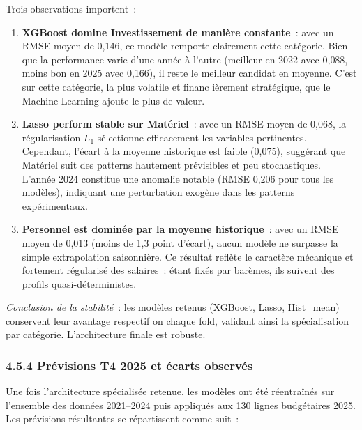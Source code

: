 \noindent
Trois observations importent~:

\begin{enumerate}
    \item \textbf{XGBoost domine Investissement de mani\`ere constante}~: avec un RMSE moyen
    de 0{,}146, ce mod\`ele remporte clairement cette cat\'egorie. Bien que la performance
    varie d'une ann\'ee \`a l'autre (meilleur en 2022 avec 0{,}088, moins bon en 2025 avec 0{,}166),
    il reste le meilleur candidat en moyenne. C'est sur cette cat\'egorie, la plus volatile
    et financ i\`erement strat\'egique, que le Machine Learning ajoute le plus de valeur.

    \item \textbf{Lasso perform stable sur Mat\'eriel}~: avec un RMSE moyen de 0{,}068,
    la r\'egularisation $L_1$ s\'electionne efficacement les variables pertinentes.
    Cependant, l'\'ecart \`a la moyenne historique est faible (0{,}075), sugg\'erant que
    Mat\'eriel suit des patterns hautement pr\'evisibles et peu stochastiques. L'année 2024
    constitue une anomalie notable (RMSE 0{,}206 pour tous les mod\`eles), indiquant une
    perturbation exog\`ene dans les patterns exp\'erimentaux.

    \item \textbf{Personnel est dominée par la moyenne historique}~: avec un RMSE moyen
    de 0{,}013 (moins de 1{,}3 point d'\'ecart), aucun mod\`ele ne surpasse la simple
    extrapolation saisonni\`ere. Ce r\'esultat reflète le caract\`ere m\'ecanique et
    fortement r\'egularisé des salaires~: \'etant fix\'es par barèmes, ils suivent
    des profils quasi-d\'eterministes.
\end{enumerate}

\noindent
\textit{Conclusion de la stabilité}~: les mod\`eles retenus (XGBoost, Lasso, Hist\_mean)
conservent leur avantage respectif on chaque fold, validant ainsi la sp\'ecialisation
par cat\'egorie. L'architecture finale est robuste.

\subsubsection*{4.5.4 \quad Pr\'evisions T4 2025 et \'ecarts observ\'es}

Une fois l'architecture sp\'ecialis\'ee retenue, les mod\`eles ont \'et\'e r\'eentra\^in\'es
sur l'ensemble des donn\'ees 2021--2024 puis appliqu\'es aux 130 lignes budg\'etaires
2025. Les pr\'evisions r\'esultantes se r\'epartissent comme suit~:

